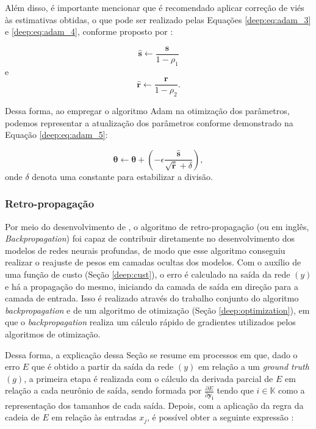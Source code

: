 Além disso, é importante mencionar que é recomendado aplicar correção de viés às estimativas obtidas, o que pode ser realizado pelas Equações \ref{deep:eq:adam_3} e \ref{deep:eq:adam_4}, conforme proposto por \cite{Goodfellow2016}:

\begin{equation}
    \label{deep:eq:adam_3}
    \boldsymbol{\hat{s}} \leftarrow \frac{\boldsymbol{s}}{1-\rho_1}
\end{equation}
e
\begin{equation}
    \label{deep:eq:adam_4}
    \boldsymbol{\hat{r}} \leftarrow \frac{\boldsymbol{r}}{1-\rho_2}.
\end{equation}

Dessa forma, ao empregar o algoritmo Adam na otimização dos parâmetros, podemos representar a atualização dos parâmetros conforme demonstrado na Equação \ref{deep:eq:adam_5}:

\begin{equation}
    \label{deep:eq:adam_5}
    \boldsymbol{\theta} \leftarrow \boldsymbol{\theta} + \left(-\epsilon \frac{\boldsymbol{\hat{s}}}{\sqrt{\boldsymbol{\hat{r}}}+\delta}\right),
\end{equation}
onde $\delta$ denota uma constante para estabilizar a divisão.


\subsubsection{Retro-propagação}
\label{deep:backprop}

\begin{sloppypar}
Por meio do desenvolvimento de \cite{rumelhart1986learning}, o algoritmo de retro-propagação (ou em inglês, \textit{Backpropagation}) foi capaz de contribuir diretamente no desenvolvimento dos modelos de redes neurais profundas, de modo que esse algoritmo conseguiu realizar o reajuste de pesos em camadas ocultas dos modelos. Com o auxílio de uma função de custo (Seção
\ref{deep:cust}), o erro é calculado na saída da rede $(y)$ e há a propagação do mesmo, iniciando da camada de saída em direção para a camada de entrada. Isso é realizado através do trabalho conjunto do algoritmo \textit{backpropagation} e de um algoritmo de otimização (Seção \ref{deep:optimization}), em que o \textit{backpropagation} realiza um cálculo rápido de gradientes utilizados pelos algoritmos de otimização.
\end{sloppypar}

Dessa forma, a explicação dessa Seção se resume em processos em que, dado o erro $E$ que é obtido a partir da saída da rede $(y)$ em relação a um \textit{ground truth} $(g)$, a primeira etapa é realizada com o cálculo da derivada parcial de $E$ em relação a cada neurônio de saída, sendo formada por $\frac{\partial E}{\partial \boldsymbol{y_i}}$ tendo que $i \in \mathbb{K}$ como a representação dos tamanhos de cada saída. Depois, com a aplicação da regra da cadeia de $E$ em relação às entradas $x_j$, é possível obter a seguinte expressão \citep{rumelhart1986learning}:

